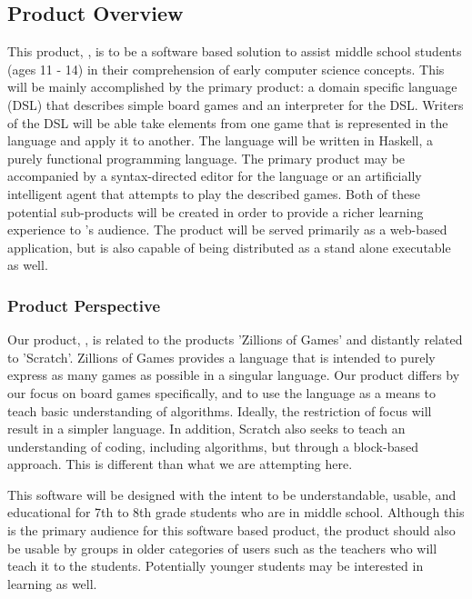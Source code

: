 \documentclass[10pt,letter,draftclsnofoot,onecolumn]{IEEEtran}
\begin{document}
\begin{singlespace}
    \subsection{Product Overview}
         This product, \name, is to be a software based solution to assist middle school students (ages 11 - 14) in their comprehension of early computer science concepts. This will be mainly accomplished by the primary product: a domain specific language (DSL) that describes simple board games and an interpreter for the DSL. Writers of the DSL will be able take elements from one game that is represented in the language and apply it to another. The language will be written in Haskell, a purely functional programming language. The primary product may be accompanied by a syntax-directed editor for the language or an artificially intelligent agent that attempts to play the described games. Both of these potential sub-products will be created in order to provide a richer learning experience to \name's audience. The product will be served primarily as a web-based application, but is also capable of being distributed as a stand alone executable as well.
    \subsubsection{Product Perspective}
        Our product, \name, is related to the products 'Zillions of Games' and distantly related to 'Scratch'\cite{scratch}. Zillions of Games provides a language that is intended to purely express as many games as possible in a singular language. Our product differs by our focus on board games specifically, and to use the language as a means to teach basic understanding of algorithms. Ideally, the restriction of focus will result in a simpler language. In addition, Scratch also seeks to teach an understanding of coding, including algorithms, but through a block-based approach. This is different than what we are attempting here.
        
        
        This software will be designed with the intent to be understandable, usable, and educational for 7th to 8th grade students who are in middle school. Although this is the primary audience for this software based product, the product should also be usable by groups in older categories of users such as the teachers who will teach it to the students. Potentially younger students may be interested in learning as well.
        

\end{singlespace}
\end{document}
